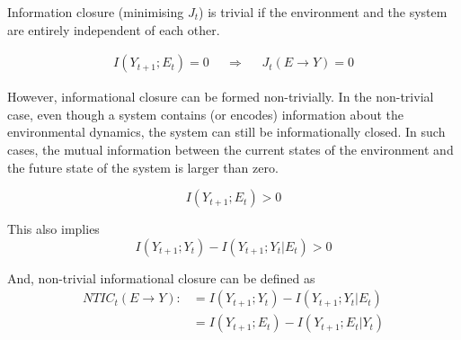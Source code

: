 \documentclass[utf8]{article}
\begin{document}
			\noindent
			Information closure (minimising $J_t$) is trivial if the environment and the system are entirely independent of each other.

				\begin{equation}
				\begin{aligned}
				{I(Y_{t+1};E_{t})=0}&&{\Rightarrow}&&{J_{t}(E \rightarrow Y )=0}
				\end{aligned}
				\end{equation}


			\noindent
			However, informational closure can be formed non-trivially. In the non-trivial case, even though a system contains (or encodes) information about the environmental dynamics, the system can still be informationally closed. In such cases, the mutual information between the current states of the environment and the future state of the system is larger than zero. %

				\begin{equation}
				I(Y_{t+1};E_{t}) > 0
				\end{equation}

			\noindent
			This also implies
				\begin{equation}
					I(Y_{t+1};Y_{t})-I(Y_{t+1};Y_{t}|E_{t}) > 0
				\end{equation}



			\noindent
			And, non-trivial informational closure can be defined as
				\begin{align}
				\label{eq:NTIC}
    				NTIC_t(E\rightarrow Y) :&=I(Y_{t+1};Y_{t})-I(Y_{t+1};Y_{t}|E_{t})\\
    				&=I(Y_{t+1};E_{t})-I(Y_{t+1};E_{t}|Y_{t})
				\end{align}
				
				
\end{document}
